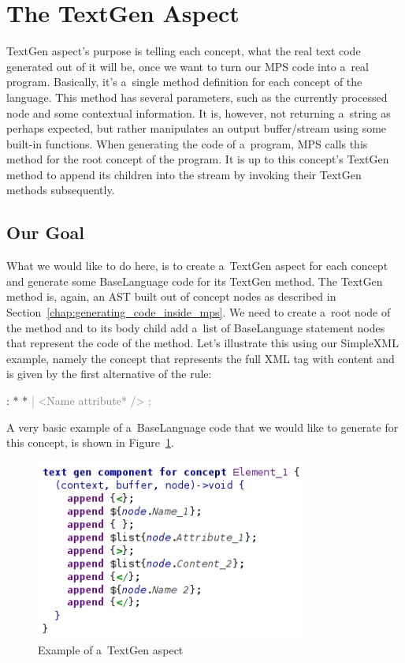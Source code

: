 \section{The TextGen Aspect}
\label{chap:textgen}

TextGen aspect's purpose is telling each concept, what the real text code generated out of it will be, once we want to turn our MPS code into a~real program.
Basically, it's a~single method definition for each concept of the language.
This method has several parameters, such as the currently processed node and some contextual information.
It is, however, not returning a~string as perhaps expected, but rather manipulates an output buffer/stream using some built-in functions.
When generating the code of a~program, MPS calls this method for the root concept of the program.
It is up to this concept's TextGen method to append its children into the stream by invoking their TextGen methods subsequently.

\subsection{Our Goal}

What we would like to do here, is to create a~TextGen aspect for each concept and generate some BaseLanguage code for its TextGen method.
The TextGen method is, again, an AST built out of concept nodes as described in Section~\ref{chap:generating_code_inside_mps}.
We need to create a~root node of the method and to its body child add a~list of BaseLanguage statement nodes that represent the code of the method.
Let's illustrate this using our SimpleXML example, namely the  concept that represents the full XML tag with content and is given by the first alternative of the  rule:

\begin{antlr}
	   :   \literal{<}  * \literal{>} * \literal{</}  \literal{>}
          \textcolor{gray}{|   \ap<\ap Name attribute* \ap/>\ap}
          \textcolor{gray}{;}
\end{antlr}

A very basic example of a~BaseLanguage code that we would like to generate for this concept, is shown in Figure~\ref{fig:textgen_example}.

\begin{figure}[h]
	\centering
	\includegraphics[width=90mm]{./img/textgen_example.png}
	\caption{Example of a~TextGen aspect}
	\label{fig:textgen_example}
\end{figure}

